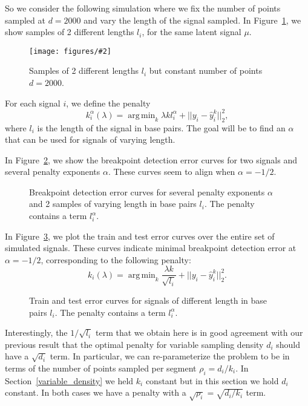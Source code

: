 \documentclass{jsfds} %
\newcommand{\fig}[3][H]{
  \begin{figure}[#1]
    \hskip -1cm
    
    \caption{#3}
    \label{fig:#2}
  \end{figure}
}
\newcommand{\figpdf}[3][H]{
  \begin{figure}[#1]
    \hskip -1cm
    \texttt{[image: figures/\#2]}
    \caption{#3}
    \label{fig:#2}
  \end{figure}
}
\DeclareMathOperator*{\argmin}{arg\,min}
\begin{document}
So we consider the following simulation where we fix the number of
points sampled at $d=2000$ and vary the length of the signal
sampled. In Figure~\ref{fig:variable-breaks-constant-size}, we show
samples of 2 different lengths $l_i$, for the same latent signal
$\mu$.

\figpdf{variable-breaks-constant-size}{Samples of 2 different lengths
  $l_i$ but constant number of points $d=2000$.}

\newpage

For each signal $i$, we define the penalty
\begin{equation}
  \label{eq:kstar_length}
  k_i^\alpha(\lambda) = \argmin_k \lambda k l_i^\alpha 
+ ||y_i - \hat y_i^k||^2_2,
\end{equation}
where $l_i$ is the length of the signal in base pairs. The goal will
be to find an $\alpha$ that can be used for signals of varying length.


In Figure~\ref{fig:variable-breaks-constant-size-berr}, we show
the breakpoint detection error curves for two signals and several
penalty exponents $\alpha$.
These curves seem to align when $\alpha=-1/2$.

\fig{variable-breaks-constant-size-berr}{Breakpoint detection error
  curves for several penalty exponents $\alpha$ and 2 samples of
  varying length in base pairs $l_i$. The penalty contains a term
  $l_i^\alpha$.}

\newpage

In Figure~\ref{fig:variable-breaks-constant-size-alpha}, we plot the
train and test error curves over the entire set of simulated signals.
These curves indicate minimal breakpoint detection error at
$\alpha=-1/2$, corresponding to the following penalty:
\begin{equation}
  \label{eq:kstar_length_opt}
  k_i(\lambda) = \argmin_k \frac{\lambda k}{\sqrt{l_i}}
  + ||y_i-\hat y_i^k||^2_2.
\end{equation}




\fig{variable-breaks-constant-size-alpha}{Train and test error curves
  for signals of different length in base pairs $l_i$. The penalty
  contains a term
  $l_i^\alpha$.}

\newpage

Interestingly, the $1/\sqrt{l_i}$ term that we obtain here is in good
agreement with our previous result that the optimal penalty for
variable sampling density $d_i$ should have a $\sqrt{d_i}$ term. In
particular, we can re-parameterize the problem to be in terms of the
number of points sampled per segment $\rho_i=d_i/k_i$. In
Section~\ref{variable_density} we held $k_i$ constant but in this
section we hold $d_i$ constant. In both cases we have a penalty with a
$\sqrt{\rho_i}=\sqrt{d_i/k_i}$ term.
\end{document}
